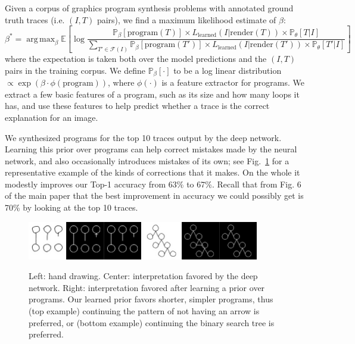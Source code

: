 \documentclass{article}
\DeclareMathOperator*{\argmax}{arg\,max} %
\newcommand{\expect}{\mathds{E}} %
\newcommand{\probability}{\mathds{P}} %
\begin{document}
Given a corpus of graphics program synthesis problems with annotated ground truth traces (i.e. $(I,T)$ pairs),
we find a maximum likelihood estimate of $\beta$:
\begin{equation}
  \beta^* = \argmax_{\beta} \expect \left[ \log \frac{\probability_{\beta} [\text{program}(T)]\times L_{\text{learned}}(I|\text{render}(T))\times \probability_\theta[T|I]}{\sum_{T'\in \mathcal{F}(I)} \probability_{\beta} [\text{program}(T')]\times L_{\text{learned}}(I|\text{render}(T'))\times \probability_\theta[T'|I]} \right]
\end{equation}
where the expectation is taken both over the model predictions and the
$(I,T)$ pairs in the training corpus.  We define $\probability_{\beta}
[\cdot]$ to be a log linear distribution $\propto \exp
(\beta\cdot \phi(\text{program}))$, where $\phi(\cdot)$ is a feature
extractor for programs.  We extract a few basic features of a
program, such as its size and how many loops it has, and use these
features to help predict whether a trace is the correct explanation
for an image.

We synthesized programs for the top 10 traces
output by the deep network.  Learning this prior over programs can
help correct mistakes made by the neural network, and also
occasionally introduces mistakes of its own; see
Fig.~\ref{exampleOfProgramCorrectingMistake} for a representative
example of the kinds of corrections that it makes. On the whole
it modestly improves our Top-1 accuracy from 63\% to 67\%.  Recall that
from Fig. 6 of the main paper that the best improvement
in accuracy we could possibly get is 70\% by looking at the top 10 traces. 
\begin{figure}[h]\centering
  \begin{minipage}{6cm}
      \includegraphics[width = 5cm]{figures/programSuccess7.png}
  \includegraphics[width = 5cm]{figures/programSuccess16.png}
    \end{minipage}
  \caption{Left: hand drawing. Center: interpretation favored by the deep network. Right: interpretation favored after learning a prior over programs. Our learned prior favors shorter, simpler programs, thus (top example) continuing the pattern of not having an arrow is preferred, or (bottom example) continuing the binary search tree is preferred.}\label{exampleOfProgramCorrectingMistake}
\end{figure}
\pagebreak
\end{document}
